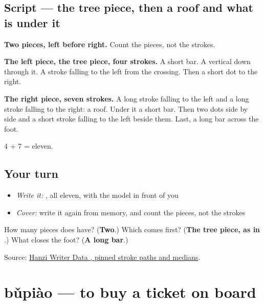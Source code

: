 \subsection*{Script — the tree piece, then a roof and what is under it}

\begin{quote}
\end{quote}

\textbf{Two pieces, left before right.} Count the pieces, not the strokes.

\textbf{The left piece, the tree piece, four strokes.} A short bar. A vertical down through it. A stroke falling to the left from the crossing. Then a short dot to the right.

\textbf{The right piece, seven strokes.} A long stroke falling to the left and a long stroke falling to the right: a roof. Under it a short bar. Then two dots side by side and a short stroke falling to the left beside them. Last, a long bar across the foot.

4 + 7 = eleven.

\subsection*{Your turn}
\begin{itemize}
\raggedright
  \item \emph{Write it:} , all eleven, with the model in front of you
  \item \emph{Cover:} write it again from memory, and count the pieces, not the strokes
\end{itemize}

\begin{tcolorbox}[breakable,colback=teal!4,colframe=teal!35!black,title={Before you move on}]
How many pieces does  have? (\textbf{Two}.) Which comes first? (\textbf{The tree piece, as in }.) What closes the foot? (\textbf{A long bar}.)

Source: \href{https://raw.githubusercontent.com/chanind/hanzi-writer-data/68d10a4b21150cae5e1ebbd223eed289cf32d90c/data/\%E6\%A3\%80.json}{Hanzi Writer Data , pinned stroke paths and medians}.
\end{tcolorbox}
\section[bǔpiào]{bǔpiào — to buy a ticket on board}

